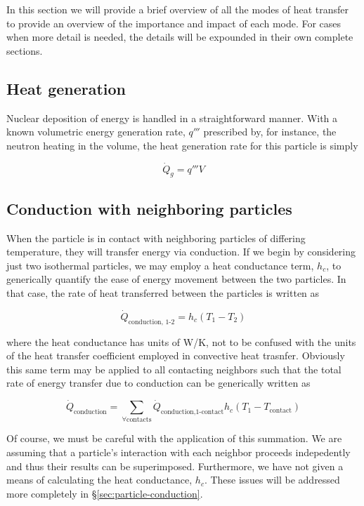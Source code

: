 In this section we will provide a brief overview of all the modes of heat transfer to provide an overview of the importance and impact of each mode. For cases when more detail is needed, the details will be expounded in their own complete sections.

\subsection{Heat generation}

Nuclear deposition of energy is handled in a straightforward manner. With a known volumetric energy generation rate, $q'''$ prescribed by, for instance, the neutron heating in the volume, the heat generation rate for this particle is simply

\begin{equation}
	\dot{Q}_g = q'''V
\end{equation}



\subsection{Conduction with neighboring particles}

When the particle is in contact with neighboring particles of differing temperature, they will transfer energy via conduction. If we begin by considering just two isothermal particles, we may employ a heat conductance term, $h_c$, to generically quantify the ease of energy movement between the two particles. In that case, the rate of heat transferred between the particles is written as

\begin{equation}
	\dot{Q}_\text{conduction, 1-2} = h_c(T_1 - T_2)
\end{equation}

where the heat conductance has units of \si{W/K}, not to be confused with the units of the heat transfer coefficient employed in convective heat trasnfer. Obviously this same term may be applied to all contacting neighbors such that the total rate of energy transfer due to conduction can be generically written as

\begin{equation}
	\dot{Q}_\text{conduction} = \sum_{\forall \text{contacts}} \dot{Q}_\text{conduction,1-contact}h_c(T_1 - T_\text{contact})
\end{equation}

Of course, we must be careful with the application of this summation. We are assuming that a particle's interaction with each neighbor proceeds indepedently and thus their results can be superimposed. Furthermore, we have not given a means of calculating the heat conductance, $h_c$. These issues will be addressed more completely in \S\ref{sec:particle-conduction}. 



